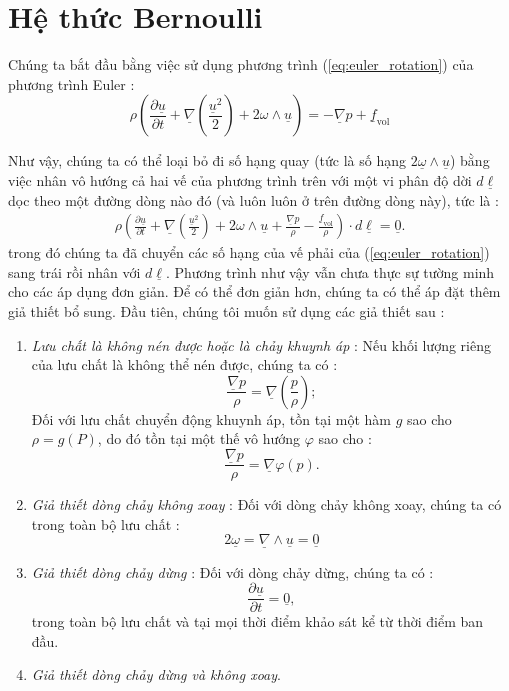 \documentclass[CO_LUU_CHAT.tex]{subfiles}
\begin{document}
\section{Hệ thức Bernoulli}
Chúng ta bắt đầu bằng việc sử dụng phương trình (\ref{eq:euler_rotation}) của phương trình Euler :
$$
\rho\left(\frac{\partial\underline{u}}{\partial t}+\underline{\nabla}\left(\frac{\underline{u}^2}{2}\right)+2\omega\wedge\underline{u}\right)=-\underline{\nabla}p+\underline{f}_{\text{vol}}
$$

Như vậy, chúng ta có thể loại bỏ đi số hạng quay (tức là số hạng $2\underline{\omega}\wedge\underline{u}$) bằng việc nhân vô hướng cả hai vế của phương trình trên với một vi phân độ dời $d\underline{\ell}$ dọc theo một đường dòng nào đó (và luôn luôn ở trên đường dòng này), tức là :
\begin{equation}\label{eq:bernoulli_differentiel}
	\begin{aligned}
		\rho\left(\frac{\partial\underline{u}}{\partial t}+\underline{\nabla}\left(\frac{\underline{u}^2}{2}\right)+2\omega\wedge\underline{u}+\frac{\underline{\nabla}p}{\rho}-\frac{\underline{f}_{\text{vol}}}{\rho}\right)\cdot d\underline{\ell}=\underline{0}.
	\end{aligned}
\end{equation}
trong đó chúng ta đã chuyển các số hạng của vế phải của (\ref{eq:euler_rotation}) sang trái rồi nhân với $d\underline{\ell}$. Phương trình như vậy vẫn chưa thực sự tường minh cho các áp dụng đơn giản. Để có thể đơn giản hơn, chúng ta có thể áp đặt thêm giả thiết bổ sung. Đầu tiên, chúng tôi muốn sử dụng các giả thiết sau :
\begin{enumerate}
	\item \emph{Lưu chất là không nén được hoặc là chảy khuynh áp} : Nếu khối lượng riêng của lưu chất là không thể nén được, chúng ta có :
	$$
	\frac{\underline{\nabla}p}{\rho}=\underline{\nabla}\left(\frac{p}{\rho}\right);
	$$
	Đối với lưu chất chuyển động khuynh áp, tồn tại một hàm $g$ sao cho $\rho=g(P)$, do đó tồn tại một thế vô hướng $\varphi$ sao cho :
	$$
	\frac{\underline{\nabla}p}{\rho}=\underline{\nabla}\varphi(p).
	$$
	\item \emph{Giả thiết dòng chảy không xoay} : Đối với dòng chảy không xoay, chúng ta có trong toàn bộ lưu chất :
	$$
	2\underline{\omega}=\underline{\nabla}\wedge\underline{u}=\underline{0}
	$$
	\item \emph{Giả thiết dòng chảy dừng} : Đối với dòng chảy dừng, chúng ta có :
	$$\frac{\partial\underline{u}}{\partial t}=\underline{0},$$
	trong toàn bộ lưu chất và tại mọi thời điểm khảo sát kể từ thời điểm ban đầu.
	\item \emph{Giả thiết dòng chảy dừng và không xoay}.
\end{enumerate}
\end{document}
